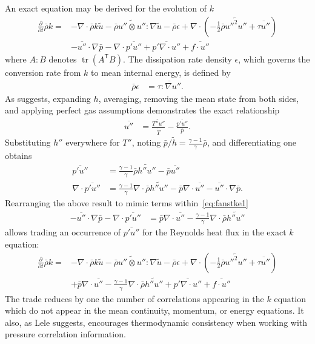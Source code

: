 \documentclass[letterpaper,11pt,nointlimits,reqno,draft]{amsart}
\newcommand{\trans}[1]{{#1}^{\ensuremath{\mathsf{T}}}}
\DeclareMathOperator{\trace}{tr}
\begin{document}
An exact equation may be derived for the evolution of $k$
\citep[\textsection{}5]{OliverFANSModels2011}
\begin{align}
\label{eq:fanstke1}
    \frac{\partial{}}{\partial{}t}\bar{\rho}k
 =
 &- \nabla\cdot\bar{\rho}k\tilde{u}
  - \bar{\rho} \widetilde{u''\otimes{}u''} : \nabla\tilde{u}
  - \bar{\rho} \epsilon
  + \nabla\cdot\left(
        -\frac{1}{2}\bar{\rho}\widetilde{{u''}^{2}u''}
      + \overline{\tau{}u''}
    \right)
\\
 &- \overline{u''}\cdot\nabla\bar{p}
  - \nabla\cdot\overline{p' u''}
  + \overline{p' \nabla\cdot{}u''}
  + \overline{f\cdot{}u''}
\end{align}
where $A:B$ denotes $\trace \left(\trans{A} B\right)$. The dissipation rate
density $\epsilon$, which governs the conversion rate from $k$ to mean internal
energy, is defined by
\begin{align}
  \bar{\rho} \epsilon &= \overline{\tau : \nabla{}u''}
.
\end{align}
As \citet[page 216]{Lele1994Compressibility} suggests, expanding $h$,
averaging, removing the mean state from both sides, and applying perfect gas
assumptions demonstrates the exact relationship
\begin{align}
  \overline{u''}
&=
  \frac{\widetilde{T''u''}}{\tilde{T}} - \frac{\overline{p'u''}}{\bar{p}}
.
\end{align}
Substituting $h''$ everywhere for $T''$, noting $\bar{p}/\tilde{h} =
\frac{\gamma-1}{\gamma}\bar{\rho}$, and differentiating one obtains
\begin{align}
  \overline{p'u''}
&=
  \frac{\gamma-1}{\gamma} \bar{\rho} \widetilde{h''u''}
- \bar{p} \overline{u''}
\\
  \nabla\cdot \overline{p'u''}
&=
  \frac{\gamma-1}{\gamma} \nabla\cdot \bar{\rho} \widetilde{h''u''}
- \bar{p}\nabla\cdot\overline{u''}
- \overline{u''}\cdot\nabla{}\bar{p}
.
\end{align}
Rearranging the above result to mimic terms within~\eqref{eq:fanstke1}
\begin{align}
  - \overline{u''}\cdot\nabla\bar{p}
  - \nabla\cdot\overline{p'u''}
&=
  \bar{p}\nabla\cdot\overline{u''}
- \frac{\gamma-1}{\gamma} \nabla\cdot \bar{\rho} \widetilde{h''u''}
\end{align}
allows trading an occurrence of $\overline{p'u''}$ for the Reynolds heat
flux in the exact $k$ equation:
\begin{align}
\label{eq:fanstke}
    \frac{\partial{}}{\partial{}t}\bar{\rho}k
 =
 &- \nabla\cdot\bar{\rho}k\tilde{u}
  - \bar{\rho} \widetilde{u''\otimes{}u''} : \nabla\tilde{u}
  - \bar{\rho} \epsilon
  + \nabla\cdot\left(
        -\frac{1}{2}\bar{\rho}\widetilde{{u''}^{2}u''}
      + \overline{\tau{}u''}
    \right)
\\
 &+ \bar{p}\nabla\cdot\overline{u''}
  - \frac{\gamma-1}{\gamma} \nabla\cdot\bar{\rho} \widetilde{h''u''}
  + \overline{p' \nabla\cdot{}u''}
  + \overline{f\cdot{}u''}
\end{align}
The trade reduces by one the number of correlations appearing in the $k$
equation which do not appear in the mean continuity, momentum, or energy
equations.  It also, as Lele suggests, encourages thermodynamic consistency
when working with pressure correlation information.
\end{document}
